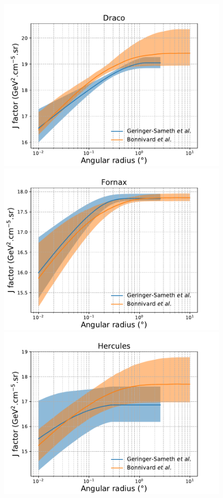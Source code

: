 \begin{figure}[ht]
{    \includegraphics[scale=0.32]{figures/glory_duck/appendix/Draco.pdf}
    \includegraphics[scale=0.32]{figures/glory_duck/appendix/Fornax.pdf}
    \includegraphics[scale=0.32]{figures/glory_duck/appendix/Hercules.pdf}
}
\end{figure}
